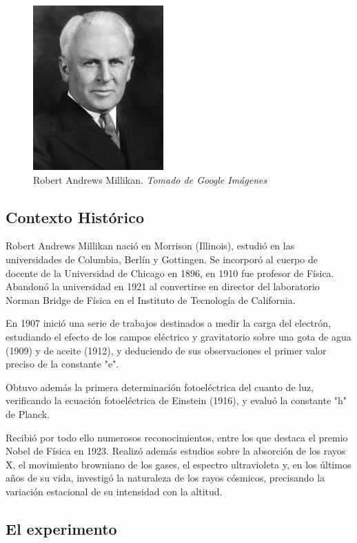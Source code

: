\documentclass[journal]{IEEEtran}
\begin{document}
\begin{center}
  \begin{figure}[h!]
  \includegraphics[width=50mm]{millikan.jpg}
  \caption{Robert Andrews Millikan. \emph{Tomado de Google Imágenes}}
  \end{figure}
\end{center}

\subsection{Contexto Histórico}

Robert Andrews Millikan nació en Morrison (Illinois), estudió en las universidades de Columbia, Berlín y Gottingen. Se incorporó al cuerpo de docente de la Universidad de Chicago en 1896, en 1910 fue profesor de Física. Abandonó la universidad en 1921 al convertirse en director del laboratorio Norman Bridge de Física en el Instituto de Tecnología de California.

En 1907 inició una serie de trabajos destinados a medir la carga del electrón, estudiando el efecto de los campos eléctrico y gravitatorio sobre una gota de agua (1909) y de aceite (1912), y deduciendo de sus observaciones el primer valor preciso de la constante "e". 

Obtuvo además la primera determinación fotoeléctrica del cuanto de luz, verificando la ecuación fotoeléctrica de Einstein (1916), y evaluó la constante "h" de Planck.

Recibió por todo ello numerosos reconocimientos, entre los que destaca el premio Nobel de Física en 1923. Realizó además estudios sobre la absorción de los rayos X, el movimiento browniano de los gases, el espectro ultravioleta y, en los últimos años de su vida, investigó la naturaleza de los rayos cósmicos, precisando la variación estacional de su intensidad con la altitud.


\subsection{El experimento}
\end{document}
